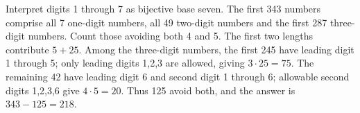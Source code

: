 Interpret digits 1 through 7 as bijective base seven. The first 343 numbers comprise all 7 one-digit numbers, all 49 two-digit numbers and the first 287 three-digit numbers. Count those avoiding both 4 and 5. The first two lengths contribute $5+25$. Among the three-digit numbers, the first 245 have leading digit 1 through 5; only leading digits 1,2,3 are allowed, giving $3\cdot25=75$. The remaining 42 have leading digit 6 and second digit 1 through 6; allowable second digits 1,2,3,6 give $4\cdot5=20$. Thus 125 avoid both, and the answer is $\boxed{343-125=218}$.
